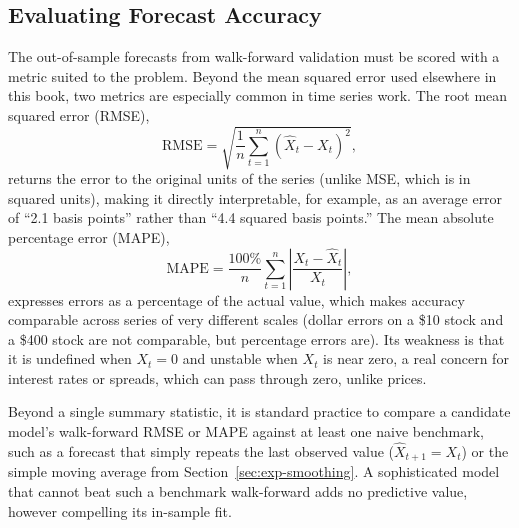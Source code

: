 \documentclass[../ai_in_finance]{subfiles}
\begin{document}
\subsection{Evaluating Forecast Accuracy}

The out-of-sample forecasts from walk-forward validation must be scored with a metric suited to the problem. Beyond the mean squared error used elsewhere in this book, two metrics are especially common in time series work. The root mean squared error (RMSE),
\begin{equation*}
\text{RMSE} = \sqrt{\frac{1}{n}\sum_{t=1}^n (\hat X_t - X_t)^2},
\end{equation*}
returns the error to the original units of the series (unlike MSE, which is in squared units), making it directly interpretable, for example, as an average error of ``2.1 basis points'' rather than ``4.4 squared basis points.'' The mean absolute percentage error (MAPE),
\begin{equation*}
\text{MAPE} = \frac{100\%}{n}\sum_{t=1}^n \left|\frac{X_t - \hat X_t}{X_t}\right|,
\end{equation*}
expresses errors as a percentage of the actual value, which makes accuracy comparable across series of very different scales (dollar errors on a \$10 stock and a \$400 stock are not comparable, but percentage errors are). Its weakness is that it is undefined when $X_t=0$ and unstable when $X_t$ is near zero, a real concern for interest rates or spreads, which can pass through zero, unlike prices.

Beyond a single summary statistic, it is standard practice to compare a candidate model's walk-forward RMSE or MAPE against at least one naive benchmark, such as a forecast that simply repeats the last observed value ($\hat X_{t+1} = X_t$) or the simple moving average from Section~\ref{sec:exp-smoothing}. A sophisticated model that cannot beat such a benchmark walk-forward adds no predictive value, however compelling its in-sample fit.
\end{document}
